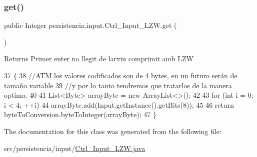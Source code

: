 \subsubsection{\texorpdfstring{get()}{get()}}
{\footnotesize\ttfamily public Integer persistencia.\+input.\+Ctrl\+\_\+\+Input\+\_\+\+L\+Z\+W.\+get (\begin{DoxyParamCaption}{ }\end{DoxyParamCaption})\hspace{0.3cm}{\ttfamily [inline]}}

\begin{DoxyReturn}{Returns}
Primer enter no llegit de l\textquotesingle{}arxiu comprimit amb L\+ZW 
\end{DoxyReturn}

\begin{DoxyCode}
37                          \{
38         \textcolor{comment}{//ATM los valores codificados son de 4 bytes, en un futuro serán de tamaño variable}
39         \textcolor{comment}{//y por lo tanto tendremos que tratarlos de la manera optima.}
40         
41         List<Byte> arrayByte = \textcolor{keyword}{new} ArrayList<>();
42 
43         \textcolor{keywordflow}{for} (\textcolor{keywordtype}{int} i = 0; i < 4; ++i) 
44             arrayByte.add(Input.getInstance().getBits(8));
45         
46         \textcolor{keywordflow}{return} byteToConversion.byteToInteger(arrayByte);
47     \}
\end{DoxyCode}


The documentation for this class was generated from the following file\+:\begin{DoxyCompactItemize}
\item 
src/persistencia/input/\hyperlink{Ctrl__Input__LZW_8java}{Ctrl\+\_\+\+Input\+\_\+\+L\+Z\+W.\+java}\end{DoxyCompactItemize}
